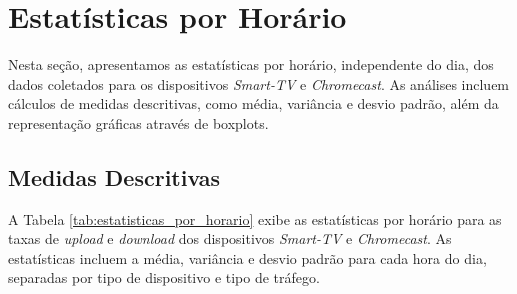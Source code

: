 \section{Estatísticas por Horário}

Nesta seção, apresentamos as estatísticas por horário, independente do dia, dos dados coletados para os dispositivos \textit{Smart-TV} e \textit{Chromecast}. As análises incluem cálculos de medidas descritivas, como média, variância e desvio padrão, além da representação gráficas através de boxplots.

\subsection{Medidas Descritivas}

A Tabela \ref{tab:estatisticas_por_horario} exibe as estatísticas por horário para as taxas de \textit{upload} e \textit{download} dos dispositivos \textit{Smart-TV} e \textit{Chromecast}. As estatísticas incluem a média, variância e desvio padrão para cada hora do dia, separadas por tipo de dispositivo e tipo de tráfego.
